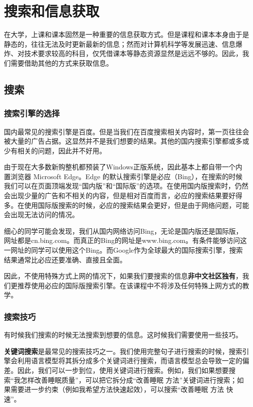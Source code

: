 \documentclass[../main.tex]{subfiles}
\begin{document}
\chapter{搜索和信息获取} %

在大学，上课和课本固然是一种重要的信息获取方式。但是课程和课本本身由于是静态的，往往无法及时更新最新的信息；然而对计算机科学等发展迅速、信息爆炸、对技术要求较高的科目，仅凭借课本等静态资源显然是远远不够的。因此，我们需要借助其他的方式来获取信息。

\section{搜索}

\subsection{搜索引擎的选择}

国内最常见的搜索引擎是百度。但是当我们在百度搜索相关内容时，第一页往往会被大量的广告占据。这显然并不是我们想要的结果。其他的国内搜索引擎都或多或少有相关的问题，因此并不好用。

由于现在大多数新购整机都预装了Windows正版系统，因此基本上都自带一个内置浏览器 Microsoft Edge。Edge 的默认搜索引擎是必应（Bing），在搜索的时候我们可以在页面顶端发现“国内版”和“国际版”的选项。在使用国内版搜索时，仍然会出现少量的广告和不相关的内容，但是相对百度而言，必应的搜索结果要好得多。在使用国际版搜索的时候，必应的搜索结果会更好，但是由于网络问题，可能会出现无法访问的情况。

细心的同学可能会发现，我们从国内网络访问Bing，无论是国内版还是国际版，网址都是cn.bing.com。而真正的Bing的网址是www.bing.com。有条件能够访问这一网址的同学可以使用这个Bing。而Google作为全球最大的国际搜索引擎，搜索结果通常比必应还要准确、直接且全面。

因此，不使用特殊方式上网的情况下，如果我们要搜索的信息\textbf{非中文社区独有}，我们更推荐使用必应的国际版搜索引擎。在该课程中不将涉及任何特殊上网方式的教学。

\subsection{搜索技巧}

有时候我们搜索的时候无法搜索到想要的信息。这时候我们需要使用一些技巧。

\textbf{关键词搜索}是最常见的搜索技巧之一。我们使用完整句子进行搜索的时候，搜索引擎会利用语言模型将其拆分成多个关键词进行搜索，而语言模型总会导致一定的偏差。因此，我们可以一步到位，使用关键词进行搜索。例如，我们如果想要搜索“我怎样改善睡眠质量”，可以把它拆分成“改善睡眠 方法”关键词进行搜索；如果需要进一步约束（例如我希望方法快速起效），可以搜索“改善睡眠 方法 快速”。
\end{document}
